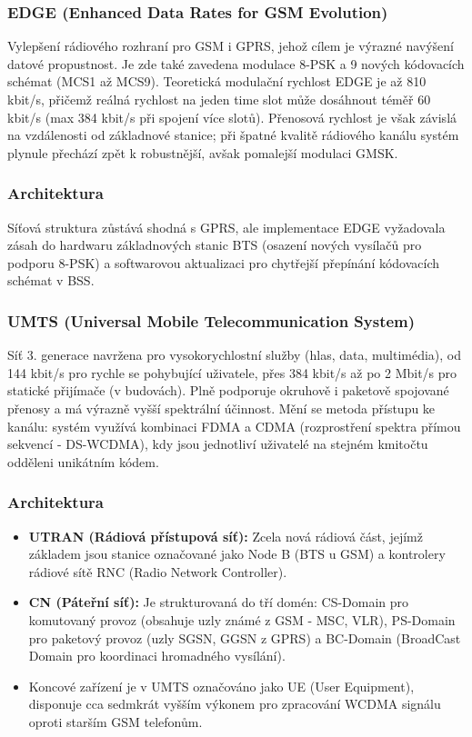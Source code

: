 		\subsubsection{EDGE (Enhanced Data Rates for GSM Evolution)}
		Vylepšení rádiového rozhraní pro GSM i GPRS, jehož cílem je výrazné navýšení datové propustnost. Je zde také zavedena modulace 8-PSK a 9 nových kódovacích schémat (MCS1 až MCS9). Teoretická modulační rychlost EDGE je až 810 kbit/s, přičemž reálná rychlost na jeden time slot může dosáhnout téměř 60 kbit/s (max 384 kbit/s při spojení více slotů). Přenosová rychlost je však závislá na vzdálenosti od základnové stanice; při špatné kvalitě rádiového kanálu systém plynule přechází zpět k robustnější, avšak pomalejší modulaci GMSK.
		\subsubsection*{Architektura}
		Síťová struktura zůstává shodná s GPRS, ale implementace EDGE vyžadovala zásah do hardwaru základnových stanic BTS (osazení nových vysílačů pro podporu 8-PSK) a softwarovou aktualizaci pro chytřejší přepínání kódovacích schémat v BSS.
		\subsubsection{UMTS (Universal Mobile Telecommunication System)}
		Síť 3. generace navržena pro vysokorychlostní služby (hlas, data, multimédia), od 144 kbit/s pro rychle se pohybující uživatele, přes 384 kbit/s až po 2 Mbit/s pro statické přijímače (v budovách). Plně podporuje okruhově i paketově spojované přenosy a má výrazně vyšší spektrální účinnost. Mění se metoda přístupu ke kanálu: systém využívá kombinaci FDMA a CDMA (rozprostření spektra přímou sekvencí - DS-WCDMA), kdy jsou jednotliví uživatelé na stejném kmitočtu odděleni unikátním kódem.
		\subsubsection*{Architektura}
			\begin{itemize}[]
				\item \textbf{UTRAN (Rádiová přístupová síť):} Zcela nová rádiová část, jejímž základem jsou stanice označované jako Node B (BTS u GSM) a kontrolery rádiové sítě RNC (Radio Network Controller).
				\item \textbf{CN (Páteřní síť):} Je strukturovaná do tří domén: CS-Domain pro komutovaný provoz (obsahuje uzly známé z GSM - MSC, VLR), PS-Domain pro paketový provoz (uzly SGSN, GGSN z GPRS) a BC-Domain (BroadCast Domain pro koordinaci hromadného vysílání).
				\item Koncové zařízení je v UMTS označováno jako UE (User Equipment), disponuje cca sedmkrát vyšším výkonem pro zpracování WCDMA signálu oproti starším GSM telefonům.
			\end{itemize}

